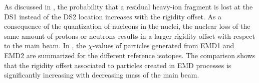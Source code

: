 As discussed in , the probability that a residual heavy-ion fragment is lost at the DS1 instead of the DS2 location increases with the rigidity offset. As a consequence of the quantization of nucleons in the nuclei, the nuclear loss of the same amount of protons or neutrons results in a larger rigidity offset with respect to the main beam. In , the $\chi$-values of particles generated from EMD1 and EMD2 are summarized for the different reference isotopes. The comparison shows that the rigidity offset associated to particles created in EMD processes is significantly increasing with decreasing mass of the main beam.  





